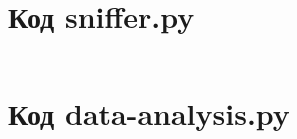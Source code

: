 \documentclass[bachelor, och, coursework]{SCWorks}
\begin{document}
  \appendix

    \section{Код sniffer.py}
    \inputminted[fontsize=\footnotesize]{Python}{code/sniffer.py}


    \section{Код data-analysis.py}
    \inputminted[fontsize=\footnotesize]{Python}{code/data-analysis.py}
\end{document}

